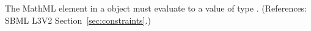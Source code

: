 The MathML  element in a \Constraint object must evaluate to a
value of type .  (References: SBML L3V2
Section~\ref{sec:constraints}.)
